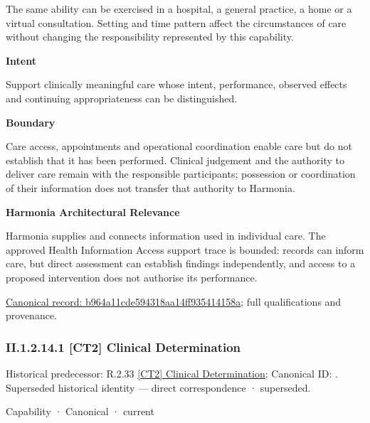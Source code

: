 The same ability can be exercised in a hospital, a general practice, a home or a virtual consultation. Setting and time pattern affect the circumstances of care without changing the responsibility represented by this capability.



\textbf{Intent}



Support clinically meaningful care whose intent, performance, observed effects and continuing appropriateness can be distinguished.



\textbf{Boundary}



Care access, appointments and operational coordination enable care but do not establish that it has been performed. Clinical judgement and the authority to deliver care remain with the responsible participants; possession or coordination of their information does not transfer that authority to Harmonia.



\textbf{Harmonia Architectural Relevance}



Harmonia supplies and connects information used in individual care. The approved Health Information Access support trace is bounded: records can inform care, but direct assessment can establish findings independently, and access to a proposed intervention does not authorise its performance.


{\footnotesize \href{../../../../../../../continuum/strategy/capability/b964a11cde594318aa14ff935414158a.md}{Canonical record: b964a11cde594318aa14ff935414158a}; full qualifications and provenance.}\par
\subsubsection*{II.1.2.14.1 [CT2] Clinical Determination}
\label{navigation:II.1.2.14.1}

{\small Historical predecessor: R.2.33 \hyperref[element:018ccd818ec142fba1ffb086d900acc6]{[CT2] Clinical Determination}; Canonical ID: \texttt{}. Superseded historical identity — direct correspondence · superseded.}\par
\label{element:39219464b6304b59bd7c3de4e237066e}
{\small Capability · Canonical · current}\par


